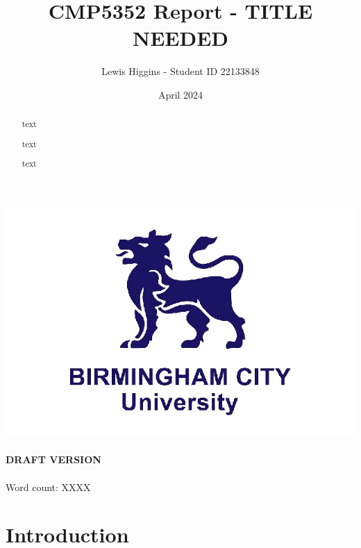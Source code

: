 \documentclass[12pt]{report}\usepackage[]{graphicx}\usepackage[]{xcolor}
\title{CMP5352 Report - TITLE NEEDED}
\author{Lewis Higgins - Student ID 22133848}
\date{April 2024}
\begin{document}
 \pagecolor{yellow} %



    \makeatletter
    \begin{titlepage}
        \begin{center}
            \includegraphics[width=0.7\linewidth]{bcu logo}\\[4ex]
            {\large \bfseries  \@title }\\[2ex]
            {\large \bfseries  DRAFT VERSION }\\[2ex]
            {\@author}\\[30ex]
            {Word count: XXXX}\\[20ex]
        \end{center}
    \end{titlepage}
    \makeatother
    \thispagestyle{empty}
    \newpage

    \pagecolor{white}

    \begin{abstract}
        text

        text

        text

    \end{abstract}

    \setcounter{page}{0} %

    \tableofcontents
    \thispagestyle{empty}

    \chapter*{Introduction}\label{ch:introduction}
\end{document}
